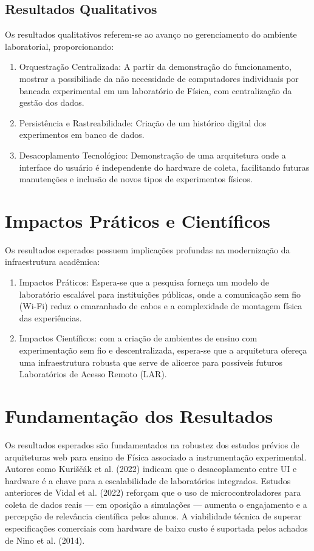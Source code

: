\subsection{Resultados Qualitativos}
Os resultados qualitativos referem-se ao avanço no gerenciamento do ambiente laboratorial, proporcionando:
\begin{enumerate}
	\item Orquestração Centralizada: A partir da demonstração do funcionamento, mostrar a possibiliade da não necessidade de computadores individuais por bancada experimental em um laboratório de Física, com centralização da gestão dos dados.
	\item Persistência e Rastreabilidade: Criação de um histórico digital dos experimentos em banco de dados.
	\item Desacoplamento Tecnológico: Demonstração de uma arquitetura onde a interface do usuário é independente do hardware de coleta, facilitando futuras manutenções e inclusão de novos tipos de experimentos físicos.
\end{enumerate}

\section{Impactos Práticos e Científicos}
Os resultados esperados possuem implicações profundas na modernização da infraestrutura acadêmica:
\begin{enumerate}
	\item Impactos Práticos: Espera-se que a pesquisa forneça um modelo de laboratório escalável para instituições públicas, onde a comunicação sem fio (Wi-Fi) reduz o emaranhado de cabos e a complexidade de montagem física das experiências.
	\item Impactos Científicos: com a criação de ambientes de ensino com experimentação sem fio e descentralizada, espera-se que a arquitetura ofereça uma infraestrutura robusta que serve de alicerce para possíveis futuros Laboratórios de Acesso Remoto (LAR).
\end{enumerate}

\section{Fundamentação dos Resultados}
Os resultados esperados são fundamentados na robustez dos estudos prévios de arquiteturas web para ensino de Física associado a instrumentação experimental. Autores como Kuriščák et al. (2022) indicam que o desacoplamento entre UI e hardware é a chave para a escalabilidade de laboratórios integrados. Estudos anteriores de Vidal et al. (2022) reforçam que o uso de microcontroladores para coleta de dados reais — em oposição a simulações — aumenta o engajamento e a percepção de relevância científica pelos alunos. A viabilidade técnica de superar especificações comerciais com hardware de baixo custo é suportada pelos achados de Nino et al. (2014).

